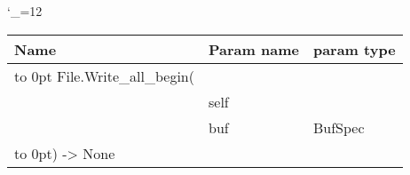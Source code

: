 \begingroup \catcode`\_=12 \tt
\begin{tabular}{lll}
\toprule
\textrm{Name}&\textrm{Param name}&\textrm{param type}\\
\midrule
\hbox to 0pt {File.Write_all_begin(\hss}\\
& self\\
& buf & BufSpec\\
\hbox to 0pt{) -> None\hss}\\
\bottomrule
\end{tabular}
\endgroup
